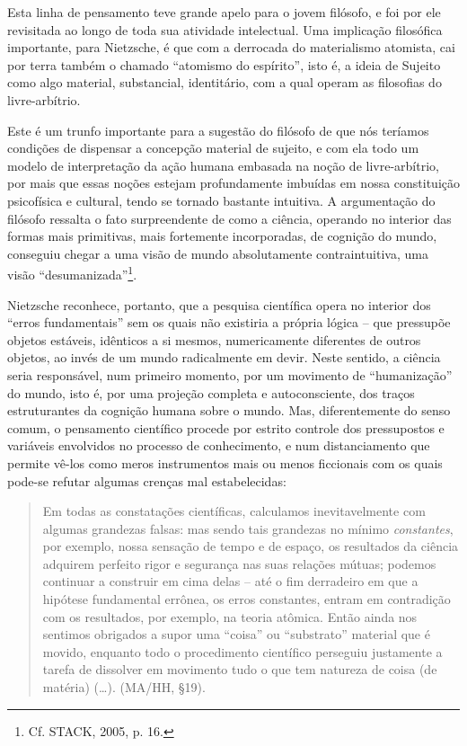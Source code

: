 \documentclass[
	12pt,				%
	openright,			%
	oneside,			%
	a4paper,			%
	english,			%
	french,				%
	spanish,			%
	brazil				%
	]{abntex2}
\begin{document}
	Esta linha de pensamento teve grande apelo para o jovem filósofo, e foi por ele revisitada ao longo de toda sua atividade intelectual. Uma implicação filosófica importante, para Nietzsche, é que com a derrocada do materialismo atomista, cai por terra também o chamado “atomismo do espírito”, isto é, a ideia de Sujeito como algo material, substancial, identitário, com a qual operam as filosofias do livre-arbítrio. 
	
	Este é um trunfo importante para a sugestão do filósofo de que nós teríamos condições de dispensar a concepção material de sujeito, e com ela todo um modelo de interpretação da ação humana embasada na noção de livre-arbítrio, por mais que essas noções estejam profundamente imbuídas em nossa constituição psicofísica e cultural, tendo se tornado bastante intuitiva. A argumentação do filósofo ressalta o fato surpreendente de como a ciência, operando no interior das formas mais primitivas, mais fortemente incorporadas, de cognição do mundo, conseguiu chegar a uma visão de mundo absolutamente contraintuitiva, uma visão “desumanizada”\footnote{Cf. STACK, 2005, p. 16.}.
	
Nietzsche reconhece, portanto, que a pesquisa científica opera no interior dos “erros fundamentais” sem os quais não existiria a própria lógica – que pressupõe objetos estáveis, idênticos a si mesmos, numericamente diferentes de outros objetos, ao invés de um mundo radicalmente em devir. Neste sentido, a ciência seria responsável, num primeiro momento, por um movimento de “humanização” do mundo, isto é, por uma projeção completa e autoconsciente, dos traços estruturantes da cognição humana sobre o mundo. Mas, diferentemente do senso comum, o pensamento científico procede por estrito controle dos pressupostos e variáveis envolvidos no processo de conhecimento, e num distanciamento que permite vê-los como meros instrumentos mais ou menos ficcionais com os quais pode-se refutar algumas crenças mal estabelecidas:

\begin{quotation}
Em todas as constatações científicas, calculamos inevitavelmente com algumas grandezas falsas: mas sendo tais grandezas no mínimo \textit{constantes}, por exemplo, nossa sensação de tempo e de espaço, os resultados da ciência adquirem perfeito rigor e segurança nas suas relações mútuas; podemos continuar a construir em cima delas – até o fim derradeiro em que a hipótese fundamental errônea, os erros constantes, entram em contradição com os resultados, por exemplo, na teoria atômica. Então ainda nos sentimos obrigados a supor uma “coisa” ou “substrato” material que é movido, enquanto todo o procedimento científico perseguiu justamente a tarefa de dissolver em movimento tudo o que tem natureza de coisa (de matéria) (…). (MA/HH, §19).
\end{quotation}
\end{document}
